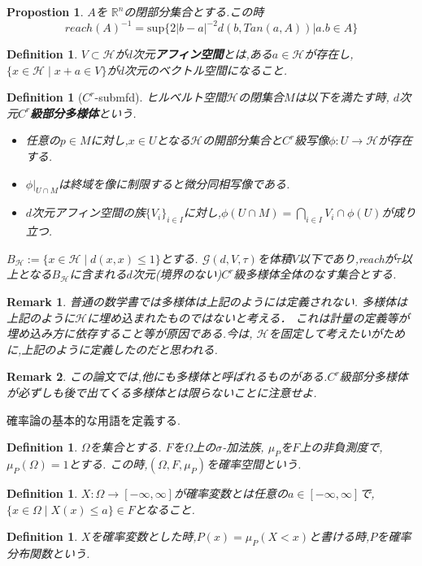 \documentclass{ujarticle}
\newtheorem{dfn}[thm]{Definition}
\newtheorem{prop}[thm]{Propostion}
\newtheorem*{rem}{Remark}
\newcommand{\gdvt}{\mathcal{G}(d,V,\tau)}
\begin{document}
\begin{prop} $A$を $\mathbb{R}^n$の閉部分集合とする.この時
  \begin{equation*}
   reach(A)^{-1}=\mathrm{sup}\{2|b-a|^{-2}d(b,Tan(a,A)) | a.b \in A\}
  \end{equation*}
\end{prop}
\begin{dfn}
 $V \subset \mathcal{H}$が$d$次元\textbf{アフィン空間}とは,ある$a \in \mathcal{H}$が存在し,$\{ x \in \mathcal{H} \mid x + a \in V \}$が$d$次元のベクトル空間になること.
\end{dfn}
\begin{dfn}[$C^r$-submfd]
ヒルベルト空間$\mathcal{H}$の閉集合$M$は以下を満たす時,
$d$次元$C^r$\textbf{級部分多様体}という.
\begin{itemize}
  \item 任意の$p \in M$に対し,$x \in U$となる$\mathcal{H}$の開部分集合と$C^r$級写像$\phi:U \to \mathcal{H}$が存在する.
  \item $\phi|_{U \cap M}$は終域を像に制限すると微分同相写像である.
  \item $d$次元アフィン空間の族$\{ V_i \}_{i \in I}$に対し,$\phi(U \cap M)=\bigcap_{i \in I} V_i \cap \phi(U)$が成り立つ.
\end{itemize}
  $B_{\mathcal{H}}:= \{ x \in \mathcal{H} \mid d(x,x) \le 1 \}$とする.
$\gdvt$を体積$V$以下であり,reachが$\tau$以上となる$B_{\mathcal{H}}$に含まれる$d$次元(境界のない)$C^r$級多様体全体のなす集合とする.

\end{dfn}
\begin{rem}
 普通の数学書では多様体は上記のようには定義されない.
 多様体は上記のように$\mathcal{H}$に埋め込まれたものではないと考える．
 これは計量の定義等が埋め込み方に依存すること等が原因である.今は,
 $\mathcal{H}$を固定して考えたいがために,上記のように定義したのだと思われる.
\end{rem}
\begin{rem}
 この論文では,他にも多様体と呼ばれるものがある.$C^r$級部分多様体が必ずしも後で出てくる多様体とは限らないことに注意せよ.
\end{rem}
確率論の基本的な用語を定義する.
\begin{dfn}
 $\Omega$を集合とする.
 $F$を$\Omega$上の$\sigma$-加法族,
 $\mu_P$を$F$上の非負測度で,$\mu_P(\Omega)=1$とする.
 この時,$(\Omega,F,\mu_P)$を確率空間という.
\end{dfn}
\begin{dfn}
 $X:\Omega \to [-\infty,\infty]$が確率変数とは任意の$a \in [-\infty,\infty]$で,$\{x \in \Omega \mid X(x) \le a \} \in F$となること.
\end{dfn}
\begin{dfn}
 $X$を確率変数とした時,$P(x) = \mu_P(X <x)$と書ける時,$P$を確率分布関数という.
\end{dfn}
\end{document}
